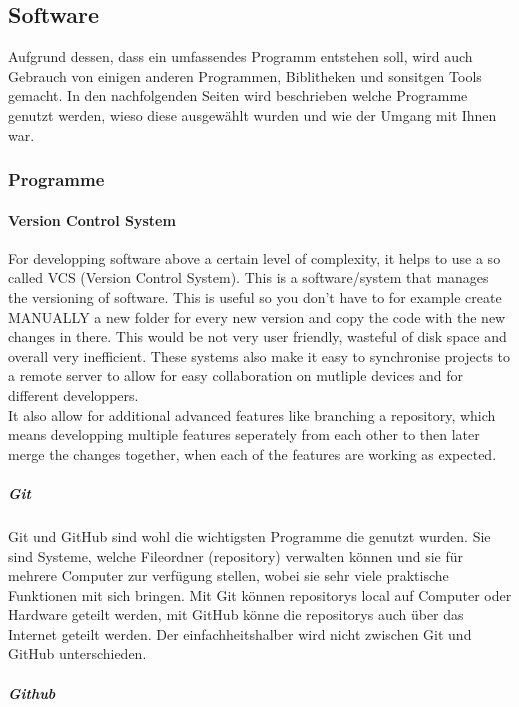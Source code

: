 \documentclass[a4paper,11pt]{article}
\begin{document}
\subsection{Software}

Aufgrund dessen, dass ein umfassendes Programm entstehen soll, wird auch Gebrauch von einigen anderen Programmen, Biblitheken und sonsitgen Tools gemacht. In den nachfolgenden Seiten wird beschrieben welche Programme genutzt werden, wieso diese ausgewählt wurden und wie der Umgang mit Ihnen war.  


\subsubsection{Programme}

\paragraph{Version Control System}

For developping software above a certain level of complexity, it helps to use a so called VCS (Version Control System). This is a software/system that manages the versioning of software. This is useful so you don't have to for example create MANUALLY a new folder for every new version and copy the code with the new changes in there. This would be not very user friendly, wasteful of disk space and overall very inefficient. These systems also make it easy to synchronise projects to a remote server to allow for easy collaboration on mutliple devices and for different developpers.\\

It also allow for additional advanced features like branching a repository, which means developping multiple features seperately from each other to then later merge the changes together, when each of the features are working as expected.

\subparagraph{Git}

Git und GitHub sind wohl die wichtigsten Programme die genutzt wurden. Sie sind Systeme, welche Fileordner (repository) verwalten können und sie für mehrere Computer zur verfügung stellen, 
wobei sie sehr viele praktische Funktionen mit sich bringen. Mit Git können repositorys local auf Computer oder Hardware geteilt werden, mit GitHub könne die repositorys auch 
über das Internet geteilt werden. Der einfachheitshalber wird nicht zwischen Git und GitHub unterschieden. 

\subparagraph{Github}
\end{document}
